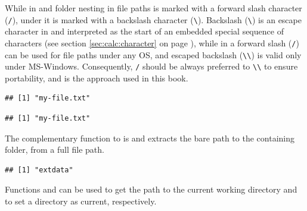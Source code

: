 \documentclass[krantz2]{krantz}\usepackage{knitr}
\begin{document}
\begin{warningbox}
While in  and  folder nesting in file paths is marked with a forward slash character (\verb|/|), under  it is marked with a backslash character (\verb|\|). Backslash (\verb|\|) is an escape character in \Rlang and interpreted as the start of an embedded special sequence of characters (see section \ref{sec:calc:character} on page \pageref{sec:calc:character}), while in \Rlang a forward slash (\verb|/|) can be used for file paths under any OS, and escaped backslash (\verb|\\|) is valid only under MS-Windows. Consequently, \verb|/| should be always preferred to \verb|\\| to ensure portability, and is the approach used in this book.

\begin{knitrout}\footnotesize
{}\color{fgcolor}\begin{kframe}
\begin{alltt}
\hlstd{(}\hlstd{)}
\end{alltt}
\begin{verbatim}
## [1] "my-file.txt"
\end{verbatim}
\begin{alltt}
\hlstd{(}\hlstd{)}
\end{alltt}
\begin{verbatim}
## [1] "my-file.txt"
\end{verbatim}
\end{kframe}
\end{knitrout}
\end{warningbox}

The complementary function to  is  and extracts the bare path to the containing folder, from a full file path.

\begin{knitrout}\footnotesize
{}\color{fgcolor}\begin{kframe}
\begin{alltt}
\hlstd{(}\hlstd{)}
\end{alltt}
\begin{verbatim}
## [1] "extdata"
\end{verbatim}
\end{kframe}
\end{knitrout}
Functions  and  can be used to get the path to the current working directory and to set a directory as current, respectively.
\end{document}
